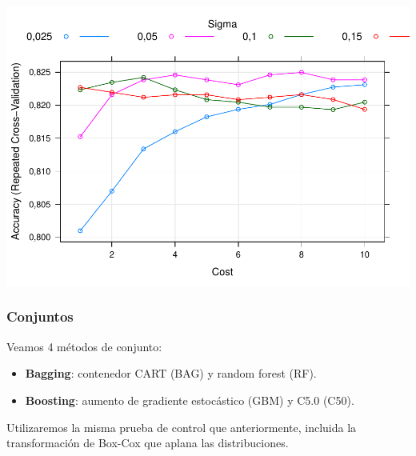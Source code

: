 \documentclass[]{article}
\providecommand{\tightlist}{%
  \setlength{\itemsep}{0pt}\setlength{\parskip}{0pt}}
\begin{document}
\includegraphics{titanicDataClean_files/figure-latex/datasetTrain_precission_plot-1.pdf}

\subsubsection{Conjuntos}\label{conjuntos}

Veamos 4 métodos de conjunto:

\begin{itemize}
\tightlist
\item
  \textbf{Bagging}: contenedor CART (BAG) y random forest (RF).
\item
  \textbf{Boosting}: aumento de gradiente estocástico (GBM) y C5.0
  (C50).
\end{itemize}

Utilizaremos la misma prueba de control que anteriormente, incluida la
transformación de Box-Cox que aplana las distribuciones.
\end{document}
